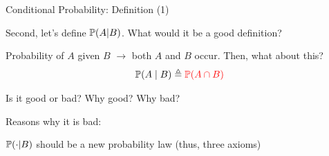 \begin{frame}{Conditional Probability: Definition (1)}

\plitemsep 0.1in
\bci 

\item<1-> Second, let's define $\mathbb{P}( A | B )$. What would it be a good definition?

\item<2-> Probability of $A$ given $B$ $\rightarrow$ both $A$ and $B$ occur. Then, what about this?
$$
\mathbb{P}( A \mid B ) \triangleq {\color{red} \mathbb{P}( A \cap B )}
$$

\item<3-> Is it good or bad? Why good? Why bad?

\item<4-> Reasons why it is bad: 

\bci
\item $\mathbb{P}( \cdot | B )$ should be a new probability law (thus, three axioms)
\eci


\medskip



\eci 

\end{frame}

